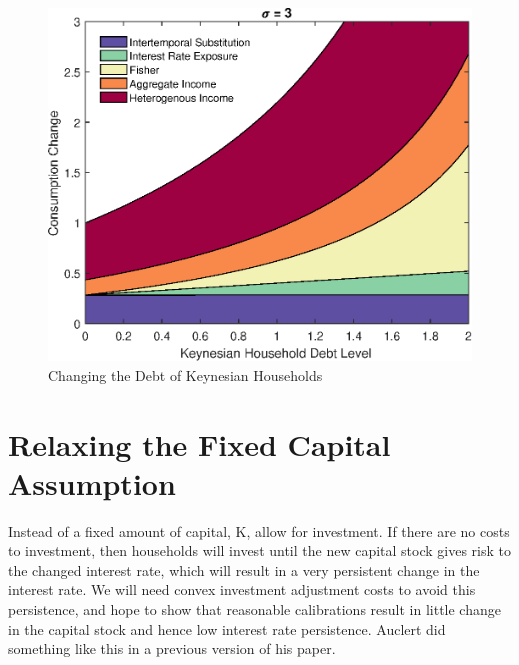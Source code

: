 \documentclass[titlepage]{\econtex}\newcommand{\texname}{ConsumptionHeterogeneity}
\begin{document}
\begin{figure}
\begin{centering}
		\includegraphics[scale=0.4]{../Matlab/DynareCode/Figures/KeynesianDebt_sigma3.eps}
		\caption{Changing the Debt of Keynesian Households}
		\label{fig:KeynesianDebt}
	\end{centering}
\end{figure}


\section{Relaxing the Fixed Capital Assumption}
Instead of a fixed amount of capital, K, allow for investment. If there are no costs to investment, then households will invest until the new capital stock gives risk to the changed interest rate, which will result in a very persistent change in the interest rate. We will need convex investment adjustment costs to avoid this persistence, and hope to show that reasonable calibrations result in little change in the capital stock and hence low interest rate persistence. Auclert did something like this in a previous version of his paper.
\end{document}
